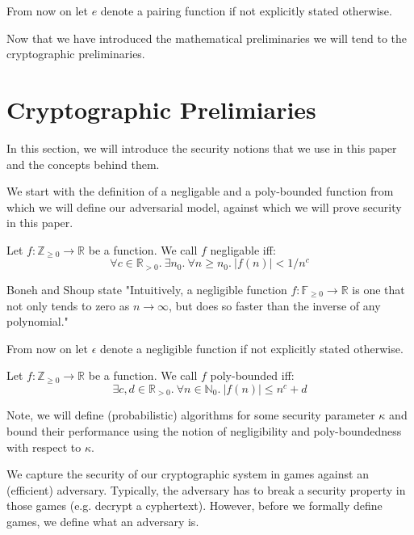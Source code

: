 From now on let $e$ denote a pairing function if not explicitly stated otherwise.

Now that we have introduced the mathematical preliminaries we will tend to the cryptographic preliminaries. 

\section{Cryptographic Prelimiaries}
In this section, we will introduce the security notions that we use in this paper and the concepts behind them.

We start with the definition of a negligable and a poly-bounded function from which we will define our adversarial model, against which we will prove security in this paper.

\begin{definition}
    Let $f: \mathbb{Z}_{\ge 0} \rightarrow \mathbb{R}$ be a function. We call $f$ negligable iff:
    \begin{equation*}
        \forall c \in \mathbb{R}_{> 0}. \ \exists n_0. \ \forall n \ge n_0. \ \vert f(n)\vert < 1/n^c
    \end{equation*}
    \parencite{boneh_shoup}
\end{definition}
Boneh and Shoup state "Intuitively, a negligible function $f:\mathbb{F}_{\ge 0} \rightarrow \mathbb{R}$ is one that not only tends to zero as $n \rightarrow \infty$, but
does so faster than the inverse of any polynomial." \parencite{boneh_shoup}

From now on let $\epsilon$ denote a negligible function if not explicitly stated otherwise. 

\begin{definition}
    Let $f: \mathbb{Z}_{\ge 0} \rightarrow \mathbb{R}$ be a function. We call $f$ poly-bounded iff:
    \begin{equation*}
        \exists c,d \in \mathbb{R}_{>0}. \ \forall n \in \mathbb{N}_0. \ \vert f(n)\vert \le n^c+d
    \end{equation*}
    \parencite{boneh_shoup}
\end{definition}


Note, we will define (probabilistic) algorithms for some security parameter $\kappa$ and bound their performance using the notion of negligibility and poly-boundedness with respect to $\kappa$.

We capture the security of our cryptographic system in games against an (efficient) adversary. Typically, the adversary has to break a security property in those games (e.g. decrypt a cyphertext). However, before we formally define games, we define what an adversary is.


